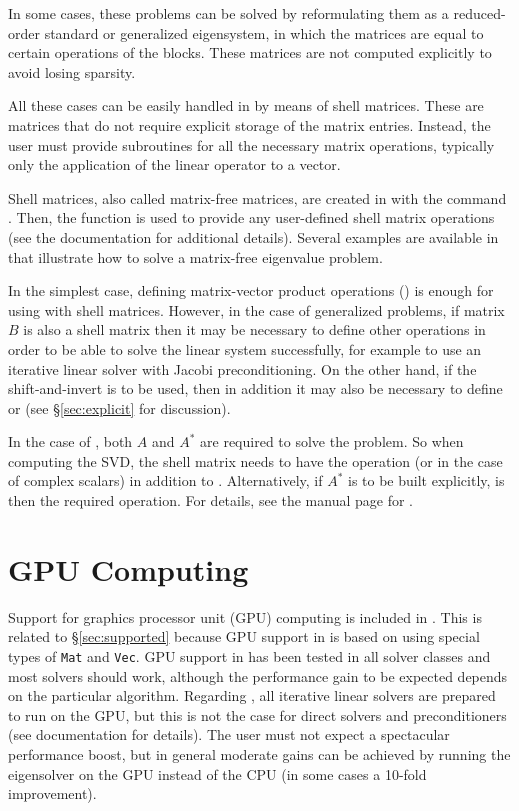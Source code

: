 In some cases, these problems can be solved by reformulating them as a reduced-order standard or generalized eigensystem, in which the matrices are equal to certain operations of the blocks. These matrices are not computed explicitly to avoid losing sparsity.

All these cases can be easily handled in \slepc by means of shell matrices. These are matrices that do not require explicit storage of the matrix entries. Instead, the user must provide subroutines for all the necessary matrix operations, typically only the application of the linear operator to a vector.

Shell matrices, also called matrix-free matrices, are created in \petsc with the command . Then, the function  is used to provide any user-defined shell matrix operations (see the \petsc{} documentation for additional details). Several examples are available in \slepc that illustrate how to solve a matrix-free eigenvalue problem.

In the simplest case, defining matrix-vector product operations () is enough for using  with shell matrices. However, in the case of generalized problems, if matrix $B$ is also a shell matrix then it may be necessary to define other operations in order to be able to solve the linear system successfully, for example  to use an iterative linear solver with Jacobi preconditioning. On the other hand, if the shift-and-invert  is to be used, then in addition it may also be necessary to define  or  (see \S\ref{sec:explicit} for discussion).

In the case of , both $A$ and $A^*$ are required to solve the problem. So when computing the SVD, the shell matrix needs to have the  operation (or  in the case of complex scalars) in addition to . Alternatively, if $A^*$ is to be built explicitly,  is then the required operation. For details, see the manual page for .

\section{GPU Computing}
\label{sec:gpu}

Support for graphics processor unit (GPU) computing is included in \slepc. This is related to \S\ref{sec:supported} because GPU support in \petsc is based on using special types of \texttt{Mat} and \texttt{Vec}. GPU support in \slepc has been tested in all solver classes and most solvers should work, although the performance gain to be expected depends on the particular algorithm. Regarding \petsc, all iterative linear solvers are prepared to run on the GPU, but this is not the case for direct solvers and preconditioners (see \petsc documentation for details). The user must not expect a spectacular performance boost, but in general moderate gains can be achieved by running the eigensolver on the GPU instead of the CPU (in some cases a 10-fold improvement).

